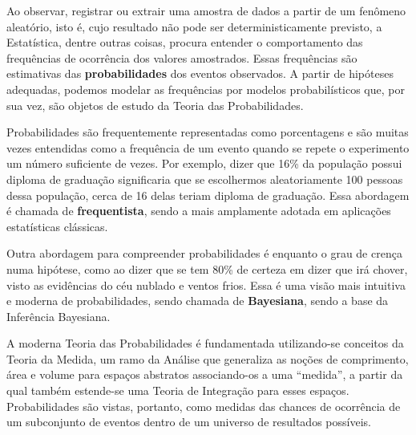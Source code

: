 Ao observar, registrar ou extrair uma amostra de dados a partir de um fenômeno aleatório,
isto é, cujo resultado não pode ser deterministicamente previsto, a Estatística, dentre
outras coisas, procura entender o comportamento das frequências de ocorrência dos valores
amostrados.
Essas frequências são estimativas das \textbf{probabilidades} dos eventos observados.
A partir de hipóteses adequadas, podemos modelar as frequências por modelos probabilísticos
que, por sua vez, são objetos de estudo da Teoria das Probabilidades.

Probabilidades são frequentemente representadas como porcentagens e são muitas vezes
entendidas como a frequência de um evento quando se repete o experimento um número
suficiente de vezes. Por exemplo, dizer que 16\% da população possui diploma de
graduação significaria que se escolhermos aleatoriamente 100 pessoas dessa população,
cerca de 16 delas teriam diploma de graduação. Essa abordagem é chamada
de \textbf{frequentista}, sendo a mais amplamente adotada em aplicações estatísticas
clássicas.

Outra abordagem para compreender probabilidades é enquanto o grau de crença numa hipótese,
como ao dizer que se tem 80\% de certeza em dizer que irá chover, visto as evidências do
céu nublado e ventos frios. Essa é uma visão mais intuitiva e moderna de probabilidades,
sendo chamada de \textbf{Bayesiana}, sendo a base da Inferência Bayesiana.

A moderna Teoria das Probabilidades é fundamentada utilizando-se conceitos da Teoria
da Medida, um ramo da Análise que generaliza as noções de comprimento, área e volume
para espaços abstratos associando-os a uma ``medida'', a partir da qual também
estende-se uma Teoria de Integração para esses espaços. Probabilidades são vistas,
portanto, como medidas das chances de ocorrência de um subconjunto de eventos
dentro de um universo de resultados possíveis.
